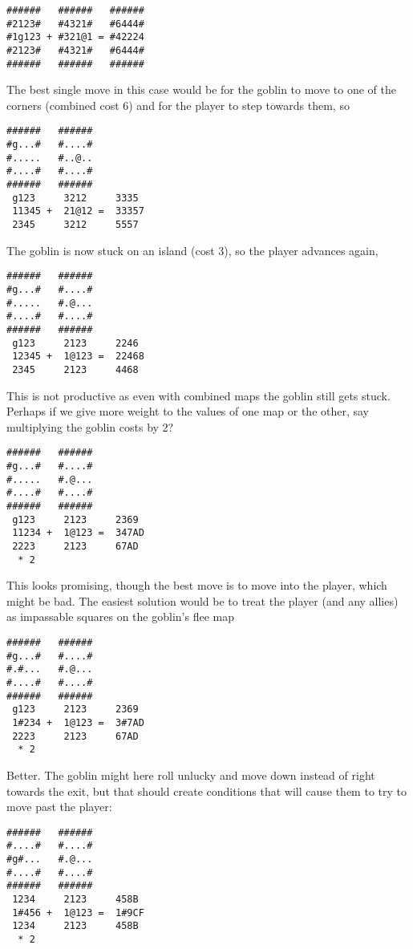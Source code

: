 \documentclass[12pt,a4paper]{article}
\begin{document}
\begin{verbatim}
######   ######   ######
#2123#   #4321#   #6444#
#1g123 + #321@1 = #42224
#2123#   #4321#   #6444#
######   ######   ######
\end{verbatim}

The best single move in this case would be for the goblin to move to
one of the corners (combined cost 6) and for the player to step
towards them, so

\begin{verbatim}
######   ######
#g...#   #....#
#.....   #..@..
#....#   #....#
######   ######
 g123     3212     3335 
 11345 +  21@12 =  33357
 2345     3212     5557 
\end{verbatim}

The goblin is now stuck on an island (cost 3), so the player
advances again,

\begin{verbatim}
######   ######
#g...#   #....#
#.....   #.@...
#....#   #....#
######   ######
 g123     2123     2246 
 12345 +  1@123 =  22468
 2345     2123     4468 
\end{verbatim}

This is not productive as even with combined maps the goblin still gets
stuck. Perhaps if we give more weight to the values of one map or the
other, say multiplying the goblin costs by 2?

\begin{verbatim}
######   ######
#g...#   #....#
#.....   #.@...
#....#   #....#
######   ######
 g123     2123     2369 
 11234 +  1@123 =  347AD
 2223     2123     67AD 
  * 2
\end{verbatim}

This looks promising, though the best move is to move into the player,
which might be bad. The easiest solution would be to treat the player
(and any allies) as impassable squares on the goblin's flee map

\begin{verbatim}
######   ######
#g...#   #....#
#.#...   #.@...
#....#   #....#
######   ######
 g123     2123     2369 
 1#234 +  1@123 =  3#7AD
 2223     2123     67AD 
  * 2
\end{verbatim}

Better. The goblin might here roll unlucky and move down instead of
right towards the exit, but that should create conditions that will
cause them to try to move past the player:

\begin{verbatim}
######   ######
#....#   #....#
#g#...   #.@...
#....#   #....#
######   ######
 1234     2123     458B 
 1#456 +  1@123 =  1#9CF
 1234     2123     458B 
  * 2
\end{verbatim}
\end{document}
